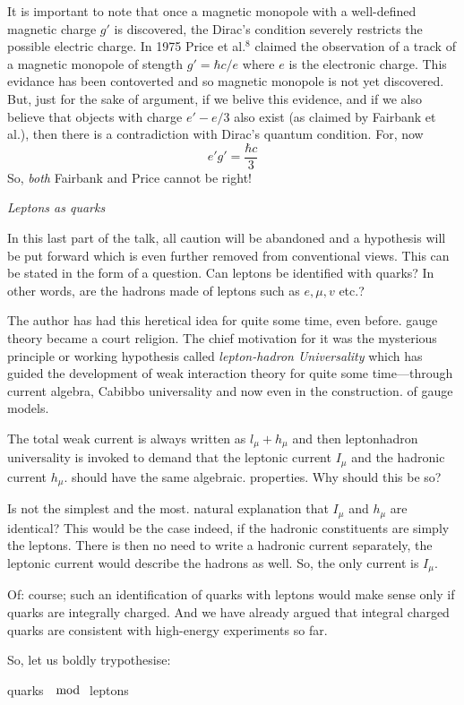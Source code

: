 It is important to note that once a magnetic monopole with a well-defined magnetic charge $g'$ is discovered, the Dirac's condition severely restricts the possible electric charge. In 1975 Price et al.$^{8}$ claimed the observation of a track of a magnetic monopole of stength $g'=\hbar c/e$ where $e$ is the electronic charge. This evidance has been contoverted and so magnetic monopole is not yet discovered. But, just for the sake of argument, if we belive this evidence, and if we also believe that objects with charge $e'-e/3$ also exist (as claimed by Fairbank et al.), then there is a contradiction with Dirac's quantum condition. For, now
$$
e'g'=\frac{\hbar  c}{3}
$$
So, {\it both} Fairbank and Price cannot be right!

{\it Leptons as quarks} 

In this last part of the talk, all caution will be abandoned and a hypothesis will be put forward which is even further removed from conventional views. This can  be stated in the form of a question. Can leptons be identified with quarks? In other words, are the hadrons made of leptons such as $e, \mu, v$ etc.?

The author has had this heretical idea for quite some time, even before.
gauge theory became a court religion. The chief motivation for it was the
mysterious principle or working hypothesis called {\it lepton-hadron Universality} which has guided the development of weak interaction theory for
quite some time—through current algebra, Cabibbo universality and now
even in the construction. of gauge models. 

The total weak current is always written as $l_{\mu}+ h_{\mu}$ and then leptonhadron universality is invoked to demand that the leptonic current $I_{\mu}$ and
the hadronic current $h_{\mu}$. should have the same algebraic. properties. Why
should this be so? 
  
Is not the simplest and the most. natural explanation that $I_{\mu}$ and $h_{\mu}$ are
identical? This would be the case indeed, if the hadronic constituents
are simply the leptons. There is then no need to write a hadronic current
separately, the leptonic current would describe the hadrons as well.  So,
the only current is $I_{\mu}$.

Of: course; such an identification of quarks with leptons would make
sense only if quarks are integrally charged. And we have already argued
that integral charged quarks are consistent with high-energy experiments
so far.

So, let us boldly  trypothesise:  
\begin{center}
quarks $\mod$ leptons
\end{center}

